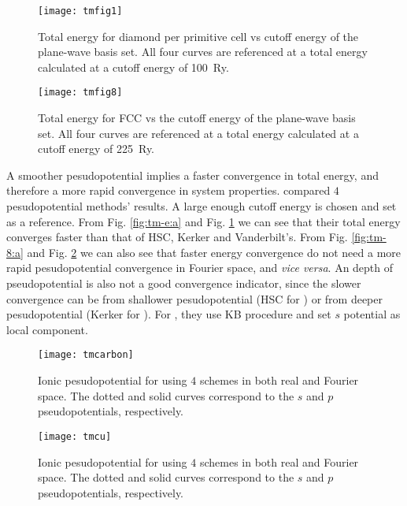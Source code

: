 \begin{figure}[H]
	\centering
	\begin{minipage}[bt]{.46\linewidth}
		\centering
		\texttt{[image: tmfig1]}
		\caption{Total energy for diamond per primitive cell vs cutoff energy
			of the plane-wave basis set. All four curves are referenced at a total
			energy calculated at a cutoff energy of \SI{100}{Ry}.
			\cite{Troullier:1991ey}}
		\label{fig:tm-e:a}
	\end{minipage}%
	\hfill
	\begin{minipage}[t]{.46\linewidth}
		\centering
		\texttt{[image: tmfig8]}
		\caption{Total energy for FCC  vs the cutoff energy
			of the plane-wave basis set. All four curves are referenced at a total
			energy calculated at a cutoff energy of \SI{225}{Ry}.
			\cite{Troullier:1991ey}}
		\label{fig:tm-e:b}
	\end{minipage}
\end{figure}
A smoother pesudopotential implies a faster convergence in
total energy, and therefore a more rapid convergence in system properties.
\citeauthor{Troullier:1991ey} compared $4$ pesudopotential methods'
results. A large enough cutoff energy is chosen and set as a reference.
From Fig. \ref{fig:tm-e:a} and Fig. \ref{fig:tm-e:b} we can see that their
total energy converges faster than that of HSC, Kerker and Vanderbilt's.
From Fig. \ref{fig:tm-8:a} and Fig. \ref{fig:tm-8:b} we can also see that
faster energy convergence do not need a more rapid pesudopotential
convergence in Fourier space, and \emph{vice versa}.
An depth of pseudopotential is also not a good convergence indicator,
since the slower convergence can be from shallower pesudopotential (HSC for )
or from deeper pesudopotential (Kerker for ).
For , they use KB procedure and set $s$ potential as local component.
\begin{figure}[H]
	\centering
	\begin{minipage}[b]{.7\linewidth}
		\centering
		\texttt{[image: tmcarbon]}
		\caption{Ionic pesudopotential for  using $4$ schemes in both real and Fourier space.
			The dotted and solid curves correspond to the $s$ and $p$ pseudopotentials, respectively.
			\cite{Troullier:1991ey}}
		\label{fig:tm-8:a}
	\end{minipage}%
	\vspace{\baselineskip}
	\begin{minipage}[b]{.7\linewidth}
		\centering
		\texttt{[image: tmcu]}
		\caption{Ionic pesudopotential for  using $4$ schemes in both real and Fourier space.
			The dotted and solid curves correspond to the $s$ and $p$ pseudopotentials, respectively.
			\cite{Troullier:1991ey}}
		\label{fig:tm-8:b}
	\end{minipage}
\end{figure}

